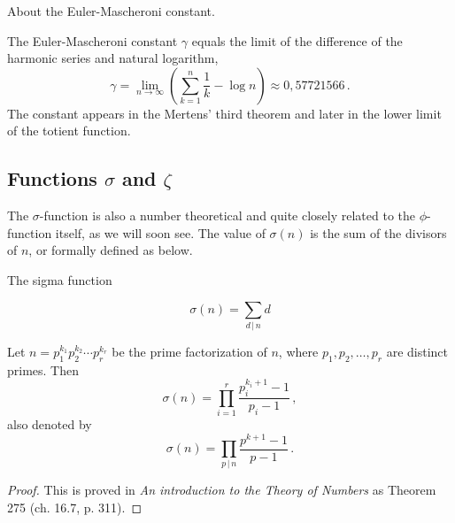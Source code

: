 \documentclass{article}
\begin{document}
\begin{remark}
About the Euler-Mascheroni constant. \emph{\cite{gamma}}

The Euler-Mascheroni constant $\gamma$ equals the limit of the difference of the harmonic series and natural logarithm,
\begin{equation*}
    \gamma=\lim_{n\rightarrow\infty} \left(\sum_{k=1}^n \frac{1}{k} - \log n\right) \approx 0,57721566\,.
\end{equation*}
The constant appears in the Mertens' third theorem and later in the lower limit of the totient function.

\end{remark}

\subsection{Functions $\sigma$ and $\zeta$}

The $\sigma$-function is also a number theoretical and quite closely related to the $\phi$-function itself, as we will soon see. The value of $\sigma(n)$ is the sum of the divisors of $n$, or formally defined as below.

\begin{definition}
The sigma function

\begin{equation*}
    \sigma(n)=\sum_{d\,\vert\, n} d
\end{equation*}
\end{definition}

\begin{lemma}
\label{lemma:sigma}
Let $n=p_1^{k_1}p_2^{k_2}\cdots p_r^{k_r}$ be the prime factorization of $n$, where $p_1,p_2,\dots,p_r$ are distinct primes. Then
\begin{equation*}
    \sigma(n)=\prod_{i=1}^r \frac{p_i^{k_i+1}-1}{p_i-1}\,,
\end{equation*}
also denoted by
\begin{equation*}
    \sigma(n) = \prod_{p\,\vert\, n} \frac{p^{k+1}-1}{p-1}\,.
\end{equation*}

\begin{proof}
This is proved in \textit{An introduction to the Theory of Numbers} \cite{HardyWright} as Theorem 275 (ch. 16.7, p. 311).
\end{proof}
\end{lemma}
\end{document}
